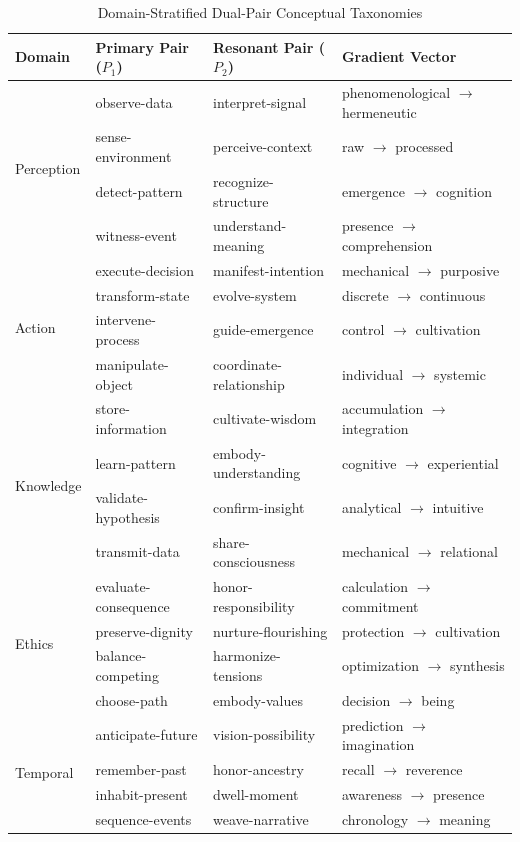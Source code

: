 \documentclass[11pt]{article}
\begin{document}
\begin{table}[h!]
\centering
\caption{Domain-Stratified Dual-Pair Conceptual Taxonomies}
\begin{tabular}{|l|l|l|l|}
\hline
\textbf{Domain} & \textbf{Primary Pair ($P_1$)} & \textbf{Resonant Pair ($P_2$)} & \textbf{Gradient Vector} \\
\hline
\multirow{4}{*}{Perception} & observe-data & interpret-signal & phenomenological $\rightarrow$ hermeneutic \\
& sense-environment & perceive-context & raw $\rightarrow$ processed \\
& detect-pattern & recognize-structure & emergence $\rightarrow$ cognition \\
& witness-event & understand-meaning & presence $\rightarrow$ comprehension \\
\hline
\multirow{4}{*}{Action} & execute-decision & manifest-intention & mechanical $\rightarrow$ purposive \\
& transform-state & evolve-system & discrete $\rightarrow$ continuous \\
& intervene-process & guide-emergence & control $\rightarrow$ cultivation \\
& manipulate-object & coordinate-relationship & individual $\rightarrow$ systemic \\
\hline
\multirow{4}{*}{Knowledge} & store-information & cultivate-wisdom & accumulation $\rightarrow$ integration \\
& learn-pattern & embody-understanding & cognitive $\rightarrow$ experiential \\
& validate-hypothesis & confirm-insight & analytical $\rightarrow$ intuitive \\
& transmit-data & share-consciousness & mechanical $\rightarrow$ relational \\
\hline
\multirow{4}{*}{Ethics} & evaluate-consequence & honor-responsibility & calculation $\rightarrow$ commitment \\
& preserve-dignity & nurture-flourishing & protection $\rightarrow$ cultivation \\
& balance-competing & harmonize-tensions & optimization $\rightarrow$ synthesis \\
& choose-path & embody-values & decision $\rightarrow$ being \\
\hline
\multirow{4}{*}{Temporal} & anticipate-future & vision-possibility & prediction $\rightarrow$ imagination \\
& remember-past & honor-ancestry & recall $\rightarrow$ reverence \\
& inhabit-present & dwell-moment & awareness $\rightarrow$ presence \\
& sequence-events & weave-narrative & chronology $\rightarrow$ meaning \\
\hline
\end{tabular}
\end{table}
\end{document}

